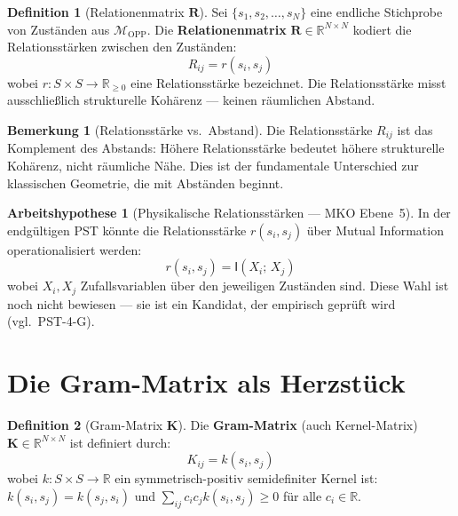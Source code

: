 \documentclass[11pt,a4paper]{article}
\theoremstyle{plain}
\theoremstyle{definition}
\newtheorem{definition}{Definition}[section]
\newtheorem{remark}{Bemerkung}[section]
\newtheorem{hypothese}{Arbeitshypothese}[section]
\newcommand{\OPP}{\mathcal{M}_{\mathrm{OPP}}}
\newcommand{\Kmat}{\mathbf{K}}
\newcommand{\Rmat}{\mathbf{R}}
\newcommand{\MI}[2]{\mathsf{I}(#1;\,#2)}
\begin{document}
\begin{definition}[Relationenmatrix $\Rmat$]
Sei $\{s_1, s_2, \ldots, s_N\}$ eine endliche Stichprobe von Zust\"{a}nden
aus $\OPP$. Die \textbf{Relationenmatrix} $\Rmat \in \mathbb{R}^{N \times N}$
kodiert die Relationsst\"{a}rken zwischen den Zust\"{a}nden:
\[
  R_{ij} = r(s_i, s_j)
\]
wobei $r\colon S \times S \to \mathbb{R}_{\geq 0}$ eine Relationsst\"{a}rke
bezeichnet. Die Relationsst\"{a}rke misst ausschlie\ss{}lich strukturelle
Koh\"{a}renz --- keinen r\"{a}umlichen Abstand.
\end{definition}

\begin{remark}[Relationsst\"{a}rke vs.\ Abstand]
Die Relationsst\"{a}rke $R_{ij}$ ist das Komplement des Abstands:
H\"{o}here Relationsst\"{a}rke bedeutet h\"{o}here strukturelle Koh\"{a}renz,
nicht r\"{a}umliche N\"{a}he. Dies ist der fundamentale Unterschied zur
klassischen Geometrie, die mit Abst\"{a}nden beginnt.
\end{remark}

\begin{hypothese}[Physikalische Relationsst\"{a}rken --- MKO Ebene~5]
In der endg\"{u}ltigen PST k\"{o}nnte die Relationsst\"{a}rke $r(s_i, s_j)$
\"{u}ber Mutual Information operationalisiert werden:
\[
  r(s_i, s_j) = \MI{X_i}{X_j}
\]
wobei $X_i, X_j$ Zufallsvariablen \"{u}ber den jeweiligen Zust\"{a}nden sind.
Diese Wahl ist noch nicht bewiesen --- sie ist ein Kandidat, der empirisch
gepr\"{u}ft wird (vgl.\ PST-4-G).
\end{hypothese}

\section{Die Gram-Matrix als Herzst\"{u}ck}

\begin{definition}[Gram-Matrix $\Kmat$]
Die \textbf{Gram-Matrix} (auch Kernel-Matrix) $\Kmat \in \mathbb{R}^{N
\times N}$ ist definiert durch:
\[
  K_{ij} = k(s_i, s_j)
\]
wobei $k\colon S \times S \to \mathbb{R}$ ein symmetrisch-positiv
semidefiniter Kernel ist: $k(s_i, s_j) = k(s_j, s_i)$ und
$\sum_{ij} c_i c_j k(s_i, s_j) \geq 0$ f\"{u}r alle $c_i \in \mathbb{R}$.
\end{definition}
\end{document}
